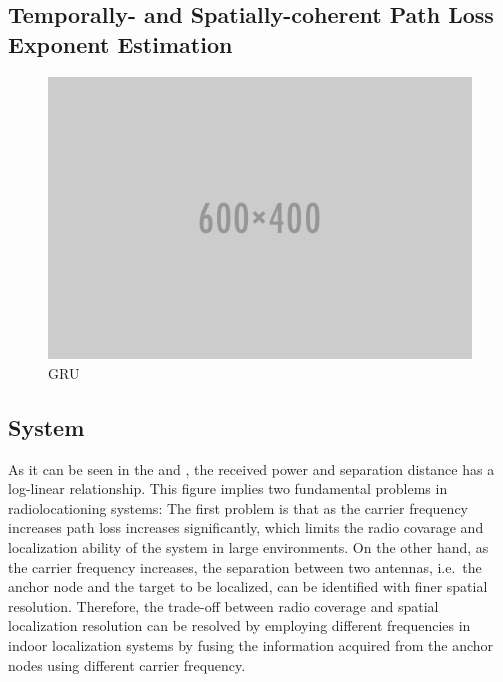     \subsection{Temporally- and Spatially-coherent Path Loss Exponent Estimation}
    \begin{figure}[thpb]
       \centering
       \includegraphics[width=\linewidth]{figures/placeholder.png}
       \caption{\label{fig:gru}GRU}
    \end{figure}

    \subsection{System}

    As it can be seen in the  and , the received power and separation distance has a log-linear relationship.
    This figure implies two fundamental problems in radiolocationing systems:
    The first problem is that as the carrier frequency increases path loss increases significantly, which limits the radio covarage and localization ability of the system in large environments.
    On the other hand, as the carrier frequency increases, the separation between two antennas, i.e.\ the anchor node and the target to be localized, can be identified with finer spatial resolution.
    Therefore, the trade-off between radio coverage and spatial localization resolution can be resolved by employing different frequencies in indoor localization systems by fusing the information acquired from the anchor nodes using different carrier frequency.


